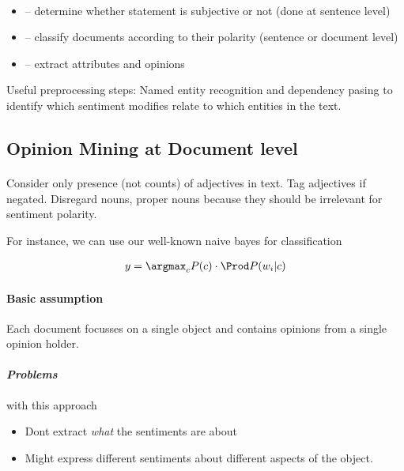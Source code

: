 \documentclass[10pt,twocolumn]{article}
\begin{document}
\paragraph{}
\begin{itemize}
\item {} -- determine whether statement is subjective
  or not (done at sentence level)
\item {} -- classify documents according to their polarity
  (sentence or document level)
\item {} -- extract attributes and opinions
\end{itemize}

Useful preprocessing steps: Named entity recognition and dependency pasing to
identify which sentiment modifies relate to which entities in the text. 

\subsection{Opinion Mining at Document level}



\paragraph{} Consider only presence (not
counts) of adjectives in text. Tag adjectives if negated. Disregard nouns,
proper nouns because they should be irrelevant for sentiment polarity.

For instance, we can use our well-known naive bayes for classification

\begin{align*}
  y = \argmax_c P(c) \cdot \Prod P(w_i|c)
\end{align*}


\paragraph{Basic assumption} Each document focusses on a single object and
contains opinions from a single opinion holder.

\paragraph{\textit{Problems}} with this approach
\begin{itemize}
\item Dont extract \textit{what} the sentiments are about
\item Might express different sentiments about different aspects of the object.
\end{itemize}
\end{document}
